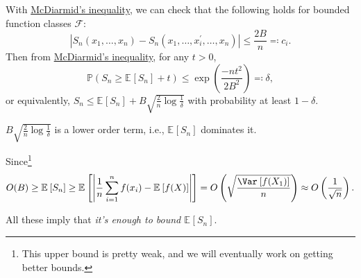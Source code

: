 With \hyperref[thm:McDiarmid-inequality]{McDiarmid's inequality}, we can check that the following holds for bounded function classes \(\mathscr{F} \):
\[
	\left\vert S_n(x_1, \dots , x_n) - S_n(x_1, \dots , x_i^{\prime} , \dots , x_n) \right\vert \leq \frac{2B}{n} \eqqcolon c_i.
\]
Then from \hyperref[thm:McDiarmid-inequality]{McDiarmid's inequality}, for any \(t > 0\),
\[
	\mathbb{P} (S_n \geq \mathbb{E}_{}\left[S_n \right] + t) \leq \exp \left( \frac{-nt^2}{2B^2} \right) \eqqcolon \delta ,
\]
or equivalently, \(S_n \leq \mathbb{E}_{}\left[S_n \right] + B \sqrt{\frac{2}{n}\log \frac{1}{\delta }}\) with probability at least \(1 - \delta \).

\begin{note}
	\(B \sqrt{\frac{2}{n} \log \frac{1}{\delta }} \) is a lower order term, i.e., \(\mathbb{E}_{}\left[S_n \right] \) dominates it.
\end{note}
\begin{explanation}
	Since\footnote{This upper bound is pretty weak, and we will eventually work on getting better bounds. }
	\[
		O(B)
		\geq \mathbb{E}_{}\left[S_n \right]
		\geq \mathbb{E}_{}\left[\left\vert \frac{1}{n} \sum_{i=1}^{n} f(x_i) - \mathbb{E}_{}\left[f(X) \right] \right\vert \right]
		= O\left( \sqrt{\frac{\Var_{}\left[f(X_1) \right] }{n}}  \right)
		\approx O\left( \frac{1}{\sqrt{n} } \right) .
	\]
\end{explanation}

All these imply that \emph{it's enough to bound \(\mathbb{E}_{}\left[S_n \right] \)}.